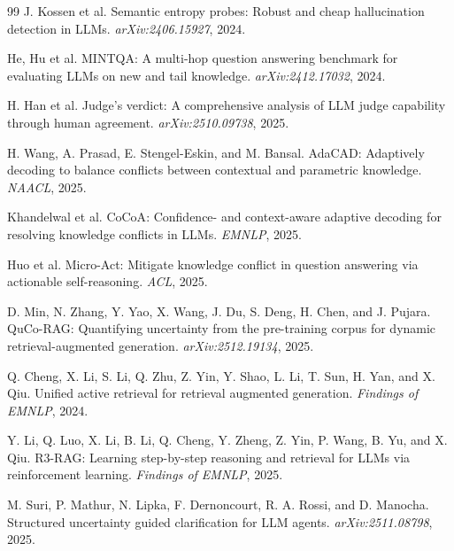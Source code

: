 \documentclass[10pt,letterpaper]{article}
\begin{document}
\begin{thebibliography}{99}
J. Kossen et al.
Semantic entropy probes: Robust and cheap hallucination detection in {LLMs}.
\emph{arXiv:2406.15927}, 2024.

He, Hu et al.
{MINTQA}: A multi-hop question answering benchmark for evaluating {LLMs} on new and tail knowledge.
\emph{arXiv:2412.17032}, 2024.

H. Han et al.
Judge's verdict: A comprehensive analysis of {LLM} judge capability through human agreement.
\emph{arXiv:2510.09738}, 2025.

H. Wang, A. Prasad, E. Stengel-Eskin, and M. Bansal.
{AdaCAD}: Adaptively decoding to balance conflicts between contextual and parametric knowledge.
\emph{NAACL}, 2025.

Khandelwal et al.
{CoCoA}: Confidence- and context-aware adaptive decoding for resolving knowledge conflicts in {LLMs}.
\emph{EMNLP}, 2025.

Huo et al.
Micro-{A}ct: Mitigate knowledge conflict in question answering via actionable self-reasoning.
\emph{ACL}, 2025.

D. Min, N. Zhang, Y. Yao, X. Wang, J. Du, S. Deng, H. Chen, and J. Pujara.
{QuCo-RAG}: Quantifying uncertainty from the pre-training corpus for dynamic retrieval-augmented generation.
\emph{arXiv:2512.19134}, 2025.

Q. Cheng, X. Li, S. Li, Q. Zhu, Z. Yin, Y. Shao, L. Li, T. Sun, H. Yan, and X. Qiu.
Unified active retrieval for retrieval augmented generation.
\emph{Findings of EMNLP}, 2024.

Y. Li, Q. Luo, X. Li, B. Li, Q. Cheng, Y. Zheng, Z. Yin, P. Wang, B. Yu, and X. Qiu.
{R3-RAG}: Learning step-by-step reasoning and retrieval for {LLMs} via reinforcement learning.
\emph{Findings of EMNLP}, 2025.

M. Suri, P. Mathur, N. Lipka, F. Dernoncourt, R. A. Rossi, and D. Manocha.
Structured uncertainty guided clarification for {LLM} agents.
\emph{arXiv:2511.08798}, 2025.

\end{thebibliography}

\appendix
\end{document}
